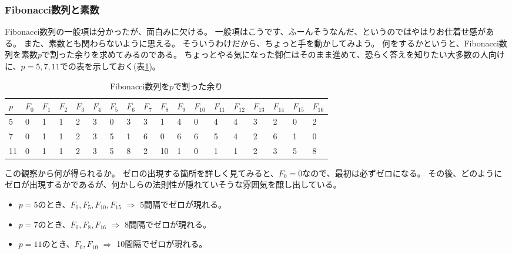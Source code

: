 

\subsubsection{Fibonacci数列と素数}
Fibonacci数列の一般項は分かったが、面白みに欠ける。
一般項はこうです、ふーんそうなんだ、というのではやはりお仕着せ感がある。
また、素数とも関わらないように思える。
そういうわけだから、ちょっと手を動かしてみよう。
何をするかというと、Fibonacci数列を素数$p$で割った余りを求めてみるのである。
ちょっとやる気になった御仁はそのまま進めて、恐らく答えを知りたい大多数の人向けに、$p=5,7,11$での表を示しておく(表\ref{table:fibonacci_example})。

\begin{table}[htb]\label{table:fibonacci_example}
 \begin{center}
    \caption{Fibonacci数列を$p$で割った余り}
  \begin{tabular}{|l|l|l|l|l|l|l|l|l|l|l|l|l|l|l|l|l|l|}\hline
    $p$ & $F_0$ & $F_1$ & $F_2$ & $F_3$ & $F_4$ & $F_5$ & $F_6$ & $F_7$ & $F_8$ & $F_9$ & $F_{10}$ & $F_{11}$ & $F_{12}$ & $F_{13}$ & $F_{14}$ & $F_{15}$ & $F_{16}$ \\ \hline\hline
    5   & 0     & 1     & 1     & 2     & 3     & 0     & 3     & 3     & 1     & 4     & 0        & 4        & 4        & 3        & 2        & 0        & 2        \\ \hline
    7   & 0     & 1     & 1     & 2     & 3     & 5     & 1     & 6     & 0     & 6     & 6        & 5        & 4        & 2        & 6        & 1        & 0        \\ \hline
    11  & 0     & 1     & 1     & 2     & 3     & 5     & 8     & 2     & 10    & 1     & 0        & 1        & 1        & 2        & 3        & 5        & 8        \\ \hline
  \end{tabular}
  \end{center}
\end{table}

この観察から何が得られるか。
ゼロの出現する箇所を詳しく見てみると、$F_0=0$なので、最初は必ずゼロになる。
その後、どのようにゼロが出現するかであるが、何かしらの法則性が隠れていそうな雰囲気を醸し出している。
\begin{itemize}
 \item $p = 5$のとき、$F_0, F_5, F_{10}, F_{15}$ $\Rightarrow$ 5間隔でゼロが現れる。
 \item $p = 7$のとき、$F_0, F_8, F_{16}$ $\Rightarrow$ 8間隔でゼロが現れる。
 \item $p = 11$のとき、$F_0, F_{10}$ $\Rightarrow$ 10間隔でゼロが現れる。
\end{itemize}

